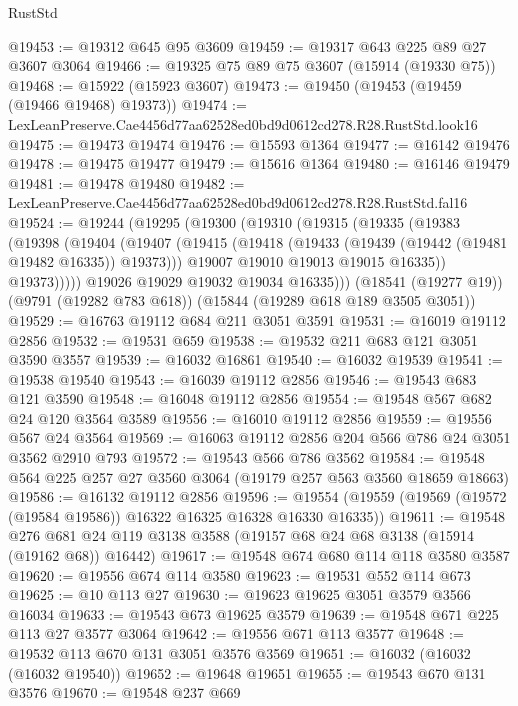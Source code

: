 \begin{lexlean}{RustStd}
\begin{coremodule}
@19453 := @19312 @645 @95 @3609
@19459 := @19317 @643 @225 @89 @27 @3607 @3064
@19466 := @19325 @75 @89 @75 @3607 (@15914 (@19330 @75))
@19468 := @15922 (@15923 @3607)
@19473 := @19450 (@19453 (@19459 (@19466 @19468) @19373))
@19474 := LexLeanPreserve.Cae4456d77aa62528ed0bd9d0612cd278.R28.RustStd.look16
@19475 := @19473 @19474
@19476 := @15593 @1364
@19477 := @16142 @19476
@19478 := @19475 @19477
@19479 := @15616 @1364
@19480 := @16146 @19479
@19481 := @19478 @19480
@19482 := LexLeanPreserve.Cae4456d77aa62528ed0bd9d0612cd278.R28.RustStd.fal16
@19524 := @19244
    (@19295
      (@19300
        (@19310
          (@19315
            (@19335
              (@19383
                (@19398
                  (@19404
                    (@19407
                      (@19415
                        (@19418 (@19433 (@19439 (@19442 (@19481 @19482 @16335)) @19373)))
                        @19007
                        @19010
                        @19013
                        @19015
                        @16335))
                    @19373)))))
          @19026
          @19029
          @19032
          @19034
          @16335)))
    (@18541 (@19277 @19))
    (@9791 (@19282 @783 @618))
    (@15844 (@19289 @618 @189 @3505 @3051))
@19529 := @16763 @19112 @684 @211 @3051 @3591
@19531 := @16019 @19112 @2856
@19532 := @19531 @659
@19538 := @19532 @211 @683 @121 @3051 @3590 @3557
@19539 := @16032 @16861
@19540 := @16032 @19539
@19541 := @19538 @19540
@19543 := @16039 @19112 @2856
@19546 := @19543 @683 @121 @3590
@19548 := @16048 @19112 @2856
@19554 := @19548 @567 @682 @24 @120 @3564 @3589
@19556 := @16010 @19112 @2856
@19559 := @19556 @567 @24 @3564
@19569 := @16063 @19112 @2856 @204 @566 @786 @24 @3051 @3562 @2910 @793
@19572 := @19543 @566 @786 @3562
@19584 := @19548 @564 @225 @257 @27 @3560 @3064 (@19179 @257 @563 @3560 @18659 @18663)
@19586 := @16132 @19112 @2856
@19596 := @19554 (@19559 (@19569 (@19572 (@19584 @19586)) @16322 @16325 @16328 @16330 @16335))
@19611 := @19548
    @276
    @681
    @24
    @119
    @3138
    @3588
    (@19157 @68 @24 @68 @3138 (@15914 (@19162 @68)) @16442)
@19617 := @19548 @674 @680 @114 @118 @3580 @3587
@19620 := @19556 @674 @114 @3580
@19623 := @19531 @552 @114 @673
@19625 := @10 @113 @27
@19630 := @19623 @19625 @3051 @3579 @3566 @16034
@19633 := @19543 @673 @19625 @3579
@19639 := @19548 @671 @225 @113 @27 @3577 @3064
@19642 := @19556 @671 @113 @3577
@19648 := @19532 @113 @670 @131 @3051 @3576 @3569
@19651 := @16032 (@16032 (@16032 @19540))
@19652 := @19648 @19651
@19655 := @19543 @670 @131 @3576
@19670 := @19548
    @237
    @669

\end{coremodule}
\end{lexlean}
